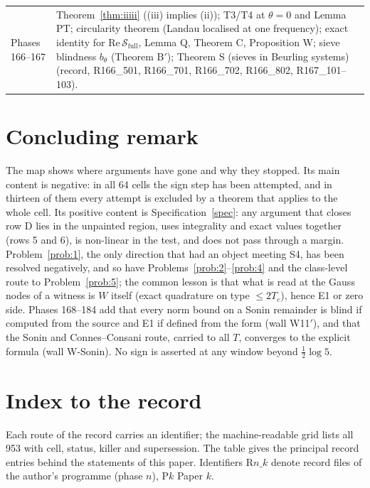 \documentclass[11pt]{amsart}
\theoremstyle{definition}
\theoremstyle{remark}
\begin{document}
\begin{longtable}{@{}p{4.2cm}p{10.3cm}@{}}
Phases 166--167 & Theorem~\ref{thm:iiiii} ((iii) implies (ii)); T3/T4 at $\theta=0$ and Lemma PT; circularity theorem (Landau localised at one frequency); exact identity for $\mathrm{Re}\,\mathcal S_{\mathrm{full}}$, Lemma Q, Theorem C, Proposition W; sieve blindness $b_\theta$ (Theorem B$'$); Theorem S (sieves in Beurling systems) (record, R166\_501, R166\_701, R166\_702, R166\_802, R167\_101--103). \\
\end{longtable}

\section*{Concluding remark}
The map shows where arguments have gone and why they stopped. Its main content is negative: in all
64 cells the sign step has been attempted, and in thirteen of them every attempt is excluded by a theorem that
applies to the whole cell. Its positive content is Specification~\ref{spec}: any argument that closes row D
lies in the unpainted region, uses integrality and exact values together (rows 5 and 6), is non-linear in
the test, and does not pass through a margin. Problem~\ref{prob:1}, the only direction that had an object meeting S4, has been resolved
negatively, and so have Problems~\ref{prob:2}--\ref{prob:4} and the class-level route to Problem~\ref{prob:5}; the common lesson is that what is read at the Gauss
nodes of a witness is $W$ itself (exact quadrature on type $\le2T_c$), hence E1 or zero side. Phases 168--184 add that every norm
bound on a Sonin remainder is blind if computed from the source and E1 if defined from the form (wall W11$'$), and that the Sonin and
Connes--Consani route, carried to all $T$, converges to the explicit formula (wall W-Sonin). No sign is asserted at any window beyond
$\frac12\log5$.

\appendix
\section{Index to the record}\label{app:index}

Each route of the record carries an identifier; the machine-readable grid lists all 953 with cell, status,
killer and supersession. The table gives the principal record entries behind the statements of this paper.
Identifiers $\mathrm{R}n\_k$ denote record files of the author's programme (phase $n$), $\mathrm Pk$ Paper $k$.
\end{document}
